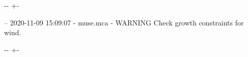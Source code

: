 \documentclass[letterpaper,10pt,english]{sphinxmanual}
\newlength\nbsphinxcodecellspacing
\begin{document}
{

\kern-\sphinxverbatimsmallskipamount\kern-\baselineskip
\kern+\FrameHeightAdjust\kern-\fboxrule
\vspace{\nbsphinxcodecellspacing}

\begin{sphinxVerbatim}[commandchars=\\\{\}]
-- 2020-11-09 15:09:07 - muse.mca - WARNING
Check growth constraints for wind.

\end{sphinxVerbatim}
}

{

\kern-\sphinxverbatimsmallskipamount\kern-\baselineskip
\kern+\FrameHeightAdjust\kern-\fboxrule
\vspace{\nbsphinxcodecellspacing}

}
\end{document}
